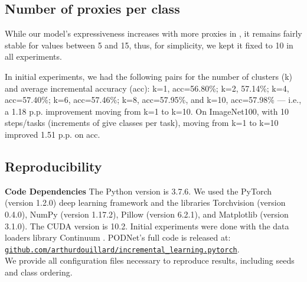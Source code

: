 \documentclass[runningheads]{llncs}
\begin{document}
\subsection{Number of proxies per class}

While our model's expressiveness increases with more proxies in , it remains fairly  stable for values between 5 and 15, thus, for simplicity, we kept it fixed to 10 in all experiments.

In initial experiments, we had the following pairs for the number of clusters (k) and average incremental accuracy (acc): k=1, acc=56.80\%; k=2, 57.14\%; k=4, acc=57.40\%; k=6, acc=57.46\%; k=8, acc=57.95\%, and k=10, acc=57.98\% --- i.e., a 1.18 p.p. improvement moving from k=1 to k=10. On ImageNet100, with 10 steps/tasks (increments of give classes per task), moving from k=1 to k=10 improved 1.51 p.p. on acc.

\subsection{Reproducibility}

\textbf{Code Dependencies} The Python version is  3.7.6. We used the PyTorch \cite{paszke2017pytorch} (version 1.2.0) deep learning framework and the libraries Torchvision (version 0.4.0), NumPy \cite{oliphant2006numpy} (version 1.17.2), Pillow (version 6.2.1), and Matplotlib \cite{hunter2007matplotlib} (version 3.1.0). The CUDA version is 10.2. Initial experiments were done with the data loaders library Continuum \cite{douillardlesort2020continuum}. PODNet's full code is released at:\\ \href{https://github.com/arthurdouillard/incremental\_learning.pytorch}{\texttt{github.com/arthurdouillard/incremental\_learning.pytorch}}. \\We provide all configuration files necessary to reproduce results, including seeds and class ordering. 




\end{document}
